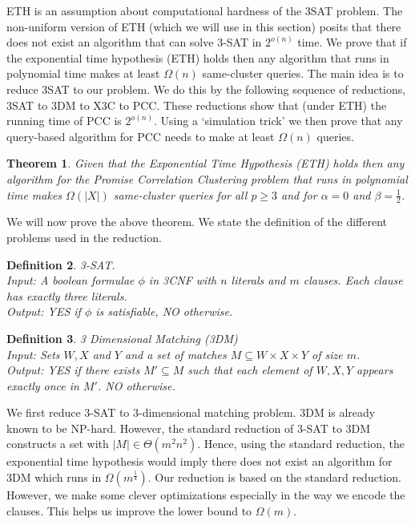 \documentclass[12pt]{article}
\newtheorem{theorem}{Theorem}
\newtheorem{definition}[theorem]{Definition}
\begin{document}
ETH is an assumption about computational hardness of the 3SAT problem. The non-uniform version of ETH (which we will use in this section) posits that there does not exist an algorithm that can solve 3-SAT in $2^{o(n)}$ time. We prove that if the exponential time hypothesis (ETH) holds then any algorithm that runs in polynomial time makes at least $\Omega(n)$ same-cluster queries. The main idea is to reduce 3SAT to our problem. We do this by the following sequence of reductions, 3SAT to 3DM to X3C to PCC. These reductions show that (under ETH) the running time of PCC is $2^{o(n)}$. Using a `simulation trick' we then prove that any query-based algorithm for PCC needs to make at least $\Omega(n)$ queries.

\begin{theorem}
Given that the Exponential Time Hypothesis (ETH) holds then any algorithm for the Promise Correlation Clustering problem  that runs in polynomial time makes $\Omega(|X|)$ same-cluster queries for all $p \ge 3$ and for $\alpha = 0$ and $\beta = \frac{1}{2}$. 
\end{theorem}

\noindent We will now prove the above theorem. We state the definition of the different problems used in the reduction.
\begin{definition}3-SAT.\\
Input: A boolean formulae $\phi$ in 3CNF with $n$ literals and $m$ clauses. Each clause has exactly three literals. \\
Output: YES if $\phi$ is satisfiable, NO otherwise. 
\end{definition}

\begin{definition}3 Dimensional Matching (3DM)\\
Input: Sets $W, X$ and $Y$ and a set of matches $M \subseteq W \times X \times Y$ of size $m$.  \\
Output: YES if there exists $M' \subseteq M$ such that each element of $W, X, Y$ appears exactly once in $M'$. NO otherwise. 
\end{definition}

\noindent We first reduce 3-SAT to 3-dimensional matching problem. 3DM is already known to be NP-hard. However, the standard reduction of 3-SAT to 3DM constructs a set with $|M| \in \Theta(m^2 n^2)$. Hence, using the standard reduction, the exponential time hypothesis would imply there does not exist an algorithm for 3DM which runs in $\Omega(m^\frac{1}{4})$. Our reduction is based on the standard reduction. However, we make some clever optimizations especially in the way we encode the clauses. This helps us improve the lower bound to $\Omega(m)$.
\end{document}
